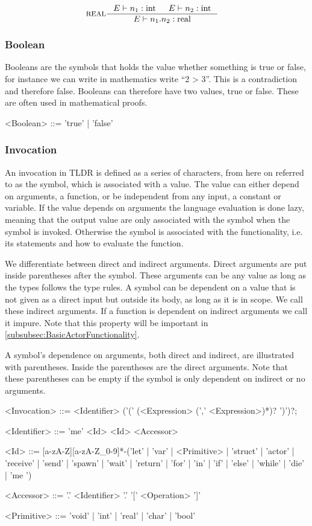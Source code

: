 \begin{align*}
&\inference[REAL]{\Tenv n_1:\Tint & \Tenv n_2:\Tint}
                 {\Tenv n_1.n_2: \Treal}
\end{align*}

\subsubsection{Boolean}
Booleans are the symbols that holds the value whether something is true or false, for instance we can write in mathematics write \enquote{2 > 3}. This is a contradiction and therefore false. Booleans can therefore have two values, true or false. These are often used in mathematical proofs.
\begin{grammar}
<Boolean> ::= 'true' | 'false'
\end{grammar}

\subsubsection{Invocation}
An invocation in TLDR is defined as a series of characters, from here on referred to as the symbol, which is associated with a value. The value can either depend on arguments, a function, or be independent from any input, a constant or variable. If the value depends on arguments the language evaluation is done lazy, meaning that the output value are only associated with the symbol when the symbol is invoked. Otherwise the symbol is associated with the functionality, i.e. its statements and how to evaluate the function. 

We differentiate between direct and indirect arguments. Direct arguments are put inside parentheses after the symbol. These arguments can be any value as long as the types follows the type rules. A symbol can be dependent on a value that is not given as a direct input but outside its body, as long as it is in scope. We call these indirect arguments. If a function is dependent on indirect arguments we call it impure. Note that this property will be important in \cref{subsubsec:BasicActorFunctionality}. 

A symbol's dependence on arguments, both direct and indirect, are illustrated with parentheses. Inside the parentheses are the direct arguments. Note that these parentheses can be empty if the symbol is only dependent on indirect or no arguments.
\begin{grammar}
<Invocation> ::= <Identifier> ('(' (<Expression> (',' <Expression>)*)? ')')?;

<Identifier> ::= 'me'
 \alt <Id>
 \alt <Id> <Accessor>

<Id> ::= [a-zA-Z][a-zA-Z\_0-9]*-('let' | 'var' | <Primitive> | 'struct' | 'actor' | 'receive' | 'send' | 'spawn' | 'wait' | 'return' | 'for' | 'in' | 'if' | 'else' | 'while' | 'die' | 'me ')

<Accessor> ::= '.' <Identifier>
 \alt '.' '[' <Operation> ']'

<Primitive> ::= 'void' | 'int' | 'real' | 'char' | 'bool'
\end{grammar}

